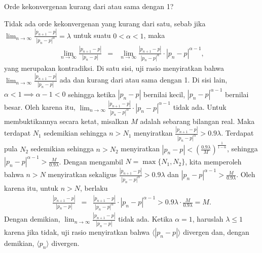 \begin{digression}{Orde kekonvergenan kurang dari atau sama dengan 1?} 

\noindent Tidak ada orde kekonvergenan 
yang kurang dari satu, sebab jika $\lim_{n\to\infty}\frac{\left|p_{n+1}-p\right|}{\left|p_{n}-p\right|^{\alpha}}=\lambda$
untuk suatu $0<\alpha<1$, maka 
\begin{eqnarray*}
\lim_{n\to\infty}\frac{|p_{n+1}-p|}{|p_{n}-p|} & = & \lim_{n\to\infty}\frac{|p_{n+1}-p|}{|p_{n}-p|^{\alpha}}\cdot|p_{n}-p|^{\alpha-1},
\end{eqnarray*}
yang merupakan kontradiksi. Di satu sisi, uji rasio menyiratkan bahwa
$\lim_{n\to\infty}\frac{|p_{n+1}-p|}{|p_{n}-p|}$ ada dan kurang dari
atau sama dengan 1. Di sisi lain, $\alpha<1\implies\alpha-1<0$ sehingga
ketika $|p_{n}-p|$ bernilai kecil, $|p_{n}-p|^{\alpha-1}$ bernilai
besar. Oleh karena itu, $\lim_{n\to\infty}\frac{|p_{n+1}-p|}{|p_{n}-p|^{\alpha}}\cdot|p_{n}-p|^{\alpha-1}$
tidak ada. Untuk membuktikannya secara ketat, misalkan $M$ adalah
sebarang bilangan real. Maka terdapat $N_{1}$ sedemikian sehingga
$n>N_{1}$ menyiratkan $\frac{|p_{n+1}-p|}{|p_{n}-p|^{\alpha}}>0.9\lambda$.
Terdapat pula $N_{2}$ sedemikian sehingga $n>N_{2}$ menyiratkan
${\displaystyle |p_{n}-p|<\left(\frac{0.9\lambda}{M}\right)^{\frac{1}{1-\alpha}}}$,
sehingga $|p_{n}-p|^{\alpha-1}>\frac{M}{0.9\lambda}$. Dengan mengambil
$N=\max\{N_{1},N_{2}\}$, kita memperoleh bahwa $n>N$ menyiratkan
sekaligus $\frac{|p_{n+1}-p|}{|p_{n}-p|^{\alpha}}>0.9\lambda$ dan
$|p_{n}-p|^{\alpha-1}>\frac{M}{0.9\lambda}$. Oleh karena itu, untuk
$n>N$, berlaku 
\begin{eqnarray*}
\frac{|p_{n+1}-p|}{|p_{n}-p|} & = & \frac{|p_{n+1}-p|}{|p_{n}-p|^{\alpha}}\cdot|p_{n}-p|^{\alpha-1}>0.9\lambda\cdot\frac{M}{0.9\lambda}=M.
\end{eqnarray*}
Dengan demikian, $\lim_{n\to\infty}\frac{|p_{n+1}-p|}{|p_{n}-p|}$
tidak ada. Ketika $\alpha=1$, haruslah $\lambda\leq1$ karena jika
tidak, uji rasio menyiratkan bahwa $\langle|p_{n}-p|\rangle$ divergen
dan, dengan demikian, $\langle p_{n}\rangle$ divergen. 

\noindent\end{digression} 

